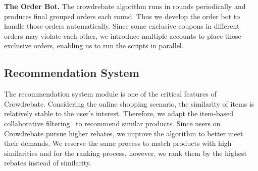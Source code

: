 \textbf{The Order Bot.} The crowdrebate algorithm runs in rounds periodically and produces final grouped orders each round. Thus we develop the order bot to handle those orders automatically. Since some exclusive coupons in different orders may violate each other, we introduce multiple accounts to place those exclusive orders, enabling us to run the scripts in parallel.

\subsection{Recommendation System}

The recommendation system module is one of the critical features of Crowdrebate. Considering the online shopping scenario, the similarity of items is relatively stable to the user’s interest. Therefore, we adapt the item-based collaborative filtering~\cite{sarwar2001item} to recommend similar products. Since users on Crowdrebate pursue higher rebates, we improve the algorithm to better meet their demands. We reserve the same process to match products with high similarities and for the ranking process, however, we rank them by the highest rebates instead of similarity.
